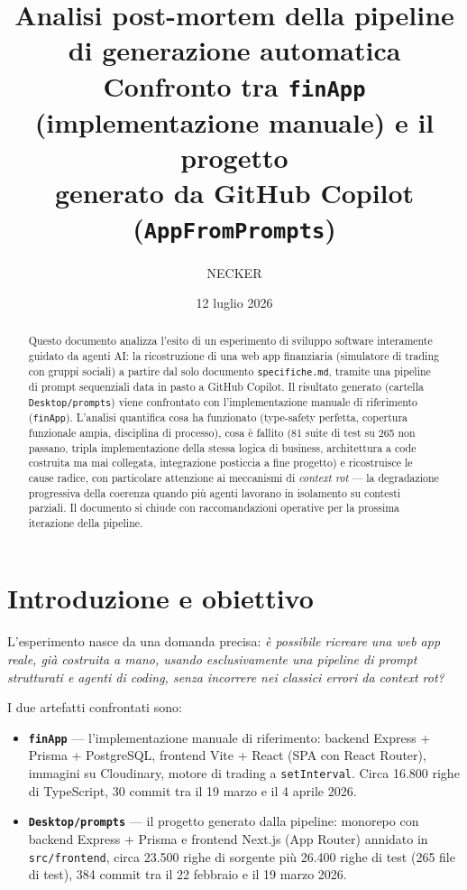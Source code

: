 \documentclass[11pt,a4paper]{article}
\title{\textbf{Analisi post-mortem della pipeline di generazione automatica}\\[4pt]
\Large Confronto tra \texttt{finApp} (implementazione manuale) e il progetto\\
generato da GitHub Copilot (\texttt{AppFromPrompts})}
\author{NECKER}
\date{12 luglio 2026}
\newcommand{\file}[1]{\texttt{\small #1}}
\begin{document}
\maketitle

\begin{abstract}
\noindent Questo documento analizza l'esito di un esperimento di sviluppo software interamente guidato da agenti AI: la ricostruzione di una web app finanziaria (simulatore di trading con gruppi sociali) a partire dal solo documento \file{specifiche.md}, tramite una pipeline di prompt sequenziali data in pasto a GitHub Copilot. Il risultato generato (cartella \file{Desktop/prompts}) viene confrontato con l'implementazione manuale di riferimento (\file{finApp}). L'analisi quantifica cosa ha funzionato (type-safety perfetta, copertura funzionale ampia, disciplina di processo), cosa \`e fallito (81 suite di test su 265 non passano, tripla implementazione della stessa logica di business, architettura a code costruita ma mai collegata, integrazione posticcia a fine progetto) e ricostruisce le cause radice, con particolare attenzione ai meccanismi di \emph{context rot} --- la degradazione progressiva della coerenza quando pi\`u agenti lavorano in isolamento su contesti parziali. Il documento si chiude con raccomandazioni operative per la prossima iterazione della pipeline.
\end{abstract}

\tableofcontents
\newpage

\section{Introduzione e obiettivo}

L'esperimento nasce da una domanda precisa: \emph{\`e possibile ricreare una web app reale, gi\`a costruita a mano, usando esclusivamente una pipeline di prompt strutturati e agenti di coding, senza incorrere nei classici errori da context rot?}

I due artefatti confrontati sono:

\begin{itemize}[leftmargin=1.5em]
  \item \textbf{\file{finApp}} --- l'implementazione manuale di riferimento: backend Express + Prisma + PostgreSQL, frontend Vite + React (SPA con React Router), immagini su Cloudinary, motore di trading a \file{setInterval}. Circa 16.800 righe di TypeScript, 30 commit tra il 19 marzo e il 4 aprile 2026.
  \item \textbf{\file{Desktop/prompts}} --- il progetto generato dalla pipeline: monorepo con backend Express + Prisma e frontend Next.js (App Router) annidato in \file{src/frontend}, circa 23.500 righe di sorgente pi\`u 26.400 righe di test (265 file di test), 384 commit tra il 22 febbraio e il 19 marzo 2026.
\end{itemize}
\end{document}
